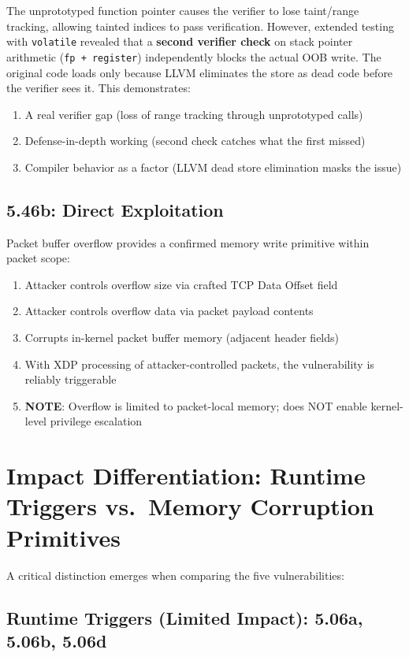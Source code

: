 The unprototyped function pointer causes the verifier to lose taint/range tracking, allowing tainted indices to pass verification. However, extended testing with \texttt{volatile} revealed that a \textbf{second verifier check} on stack pointer arithmetic (\texttt{fp + register}) independently blocks the actual OOB write. The original code loads only because LLVM eliminates the store as dead code before the verifier sees it. This demonstrates:
\begin{enumerate}[label=\arabic*.]
  \item A real verifier gap (loss of range tracking through unprototyped calls)
  \item Defense-in-depth working (second check catches what the first missed)
  \item Compiler behavior as a factor (LLVM dead store elimination masks the issue)
\end{enumerate}

\subsection{5.46b: Direct Exploitation}

Packet buffer overflow provides a confirmed memory write primitive within packet scope:
\begin{enumerate}[label=\arabic*.]
  \item Attacker controls overflow size via crafted TCP Data Offset field
  \item Attacker controls overflow data via packet payload contents
  \item Corrupts in-kernel packet buffer memory (adjacent header fields)
  \item With XDP processing of attacker-controlled packets, the vulnerability is reliably triggerable
  \item \textbf{NOTE}: Overflow is limited to packet-local memory; does NOT enable kernel-level privilege escalation
\end{enumerate}

\section{Impact Differentiation: Runtime Triggers vs.\ Memory Corruption Primitives}

A critical distinction emerges when comparing the five vulnerabilities:

\subsection{Runtime Triggers (Limited Impact): 5.06a, 5.06b, 5.06d}


